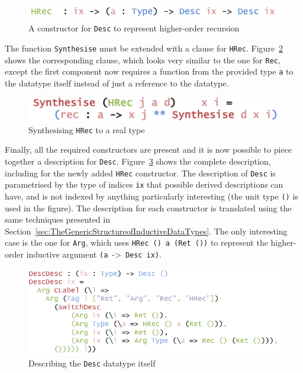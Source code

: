 \documentclass{ituthesis}
\newcommand{\ttconstructor}[1]{\textcolor{constructor-color}{\texttt{#1}}}
\newcommand{\tttype}[1]{\textcolor{type-color}{\texttt{#1}}}
\newcommand{\ttdec}[1]{\textcolor{declared-var-color}{\texttt{#1}}}
\newcommand{\ttvar}[1]{\textcolor{local-var-color}{\texttt{#1}}}
\theoremstyle{break}
\begin{document}
\begin{figure}[ht]
\begin{center}
    \includegraphics[scale=0.5]{Figures/ADescriptionForDatatypesExtended.png}
\end{center}
\caption{A constructor for \tttype{Desc} to represent higher-order recursion}
\label{fig:deschrec}
\end{figure}

The function \ttdec{Synthesise} must be extended with a clause for \ttconstructor{HRec}. Figure~\ref{fig:synthhrec} shows the corresponding clause,
which looks very similar to the one for \ttconstructor{Rec}, except the first component now requires a function from the provided type \ttvar{a} to the datatype itself instead of just a reference
to the datatype.

\begin{figure}[ht]
\begin{center}
    \includegraphics[scale=0.5]{Figures/SynthesisingDataExtended.png}
\end{center}
\caption{Synthesising \ttconstructor{HRec} to a real type}
\label{fig:synthhrec}
\end{figure}

Finally, all the required constructors are present and it is now possible to piece together a description for \tttype{Desc}. Figure~\ref{fig:descdesc} shows the complete description, including for the newly added
\ttconstructor{HRec} constructor. The description of \tttype{Desc} is parametrised by the type of indices \ttvar{ix} that possible derived descriptions can have, and is not indexed by anything particularly interesting (the unit type \tttype{()} is used in the figure).
The description for each constructor is translated using the same techniques presented in Section~\ref{sec:TheGenericStructureofInductiveDataTypes}. The only interesting case is the one for \ttconstructor{Arg}, which uses \ttconstructor{HRec ()}~\ttvar{a}~\texttt{(}\ttconstructor{Ret ()}\texttt{)} to represent the higher-order inductive argument \texttt{(}\ttvar{a}~->~\tttype{Desc}~\ttvar{ix}\texttt{)}.

\begin{figure}[ht]
\begin{center}
    \includegraphics[scale=0.5]{Figures/DescriptionDescription.png}
\end{center}
\caption{Describing the \tttype{Desc} datatype itself}
\label{fig:descdesc}
\end{figure}
\end{document}
